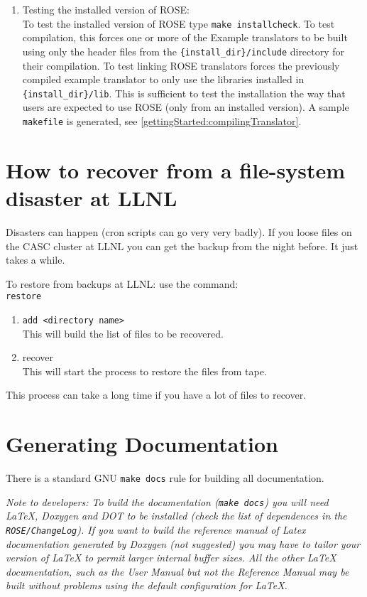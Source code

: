 \begin{enumerate}
     \item Testing the installed version of ROSE: \\
     To test the installed version of ROSE type {\tt make installcheck}.  To test
     compilation, this forces one
     or more of the Example translators to be built using only the header files from
     the {\tt \{install\_dir\}/include} directory for their compilation.  To test linking
     ROSE translators forces the previously compiled example translator to only use the libraries
     installed in {\tt \{install\_dir\}/lib}.  This is sufficient to test the installation
     the way that users are expected to use ROSE (only from an installed version).
     A sample {\tt makefile} is generated, see \ref{gettingStarted:compilingTranslator}.

\end{enumerate}

\section{How to recover from a file-system disaster at LLNL}
   Disasters can happen (cron scripts can go very very badly).  If you 
loose files on the CASC cluster at LLNL you can get the backup from the 
night before.  It just takes a while.

   To restore from backups at LLNL: use the command: \\
{\tt restore}
\begin{enumerate}
   \item {\tt add <directory name>} \\
       This will build the list of files to be recovered.
   \item recover \\
       This will start the process to restore the files from tape.
\end{enumerate}
   This process can take a long time if you have a lot of files to recover.


\section{Generating Documentation}
   There is a standard GNU {\tt make docs} rule for building all documentation.

{\it Note to developers: To build the documentation ({\tt make docs}) you will need 
LaTeX, Doxygen and DOT to be installed (check the list of dependences in the 
{\tt ROSE/ChangeLog}). If you want to build the reference manual of Latex documentation
generated by Doxygen (not suggested) you may have to tailor your version of LaTeX to 
permit larger internal buffer sizes.  All the other LaTeX documentation, such as the
User Manual but not the Reference Manual may be built without problems using the 
default configuration for LaTeX.
}

